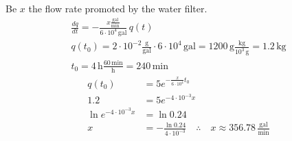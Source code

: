 \begin{solution}
\begin{solparts}
		\item 
		Be $x$ the flow rate promoted by the water filter.
		\begin{gather*}
			\frac{dq}{dt}=-\frac{x\frac{\text{gal}}{\text{min}}}{6\cdot 10^4\,\text{gal}}\, q(t)\\
			q(t_0)=2\cdot 10^{-2}\frac{\text{g}}{\text{gal}}\cdot 6\cdot 10^4\, \text{gal}=1200\,\text{g}\frac{\text{kg}}{10^3\,\text{g}}=1.2\, \text{kg}\\
			t_0=4\,\text{h}\frac{60\,\text{min}}{\text{h}}=240\,\text{min}
		\end{gather*}
		\begin{align*}
			q(t_0)&=5e^{-\frac{x}{6\cdot 10^4}t_0}\\
			1.2&=5e^{-4\cdot 10^{-3}x}\\
			\ln e^{-4\cdot 10^{-3}x}&=\ln 0.24\\
			x&=-\frac{\ln 0.24}{4\cdot 10^{-3}} \quad \therefore \quad \boxed{x\approx 356.78\,\frac{\text{gal}}{\text{min}}}
		\end{align*}
	\end{solparts}
\end{solution}